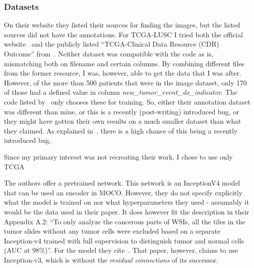 \documentclass[10pt,twocolumn,letterpaper]{article}
\begin{document}
\subsubsection{Datasets}
On their website they listed their sources for finding the images, but the listed sources did not have the annotations. For \gls{TCGA}-LUSC I tried both the official website~\cite{tcgaAnnotation} and the publicly listed ``\gls{TCGA}-Clinical Data Resource (CDR) Outcome'' from~\cite{pancan}. Neither dataset was compatible with the code as is, mismatching both on filename and certain columns. By combining different files from the former resource, I was, however, able to get the data that I was after. However, of the more than 500 patients that were in the image dataset, only 170 of those had a defined value in column \textit{new\_tumor\_event\_dx\_indicator}. 
The code listed by~\cite{sslUMAP} only chooses these for training. So, either their annotation dataset was different than mine, or this is a recently (post-writing) introduced bug, or they might have gotten their own results on a much smaller dataset than what they claimed. As explained in~, there is a high chance of this being a recently introduced bug.

Since my primary interest was not recreating their work, I chose to use only \gls{TCGA}

The authors offer a pretrained network. This network is an InceptionV4 model that can be used an encoder in \gls{MOCO}. However, they do not specify explicitly what the model is trained on nor what hyperparameters they used - assumably it would be the data used in their paper. It does however fit the description in their Appendix A.2: ``To only analyze the cancerous parts of WSIs, all the tiles in the tumor slides without any tumor cells were excluded based on a separate Inception-v4 trained with full supervision to distinguish tumor and normal
cells (AUC at 98\%)''. For the model they cite~\cite{coudray2018classification}. That paper, however, claims to use Inception-v3, which is without the \textit{residual connections} of its successor.
\end{document}

